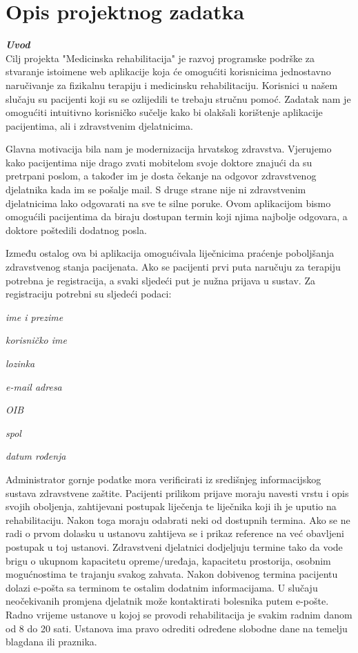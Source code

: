 \chapter{Opis projektnog zadatka}
		
		\textbf{\textit{Uvod}}\\
		
		Cilj projekta "Medicinska rehabilitacija" je razvoj programske podrške za stvaranje istoimene web aplikacije koja će omogućiti korisnicima jednostavno naručivanje za fizikalnu terapiju i medicinsku rehabilitaciju. Korisnici u našem slučaju su pacijenti koji su se ozlijedili te trebaju stručnu pomoć. Zadatak nam je omogućiti intuitivno korisničko sučelje kako bi olakšali korištenje aplikacije pacijentima, ali i zdravstvenim djelatnicima.
		
		Glavna motivacija bila nam je modernizacija hrvatskog zdravstva. Vjerujemo kako pacijentima nije drago zvati mobitelom svoje doktore znajući da su pretrpani poslom, a također im je dosta čekanje na odgovor zdravstvenog djelatnika kada im se pošalje mail. S druge strane nije ni zdravstvenim djelatnicima lako odgovarati na sve te silne poruke. Ovom aplikacijom bismo omogućili pacijentima da biraju dostupan termin koji njima najbolje odgovara, a doktore poštedili dodatnog posla.
		
		Između ostalog ova bi aplikacija omogućivala liječnicima praćenje poboljšanja zdravstvenog stanja pacijenata. Ako se pacijenti prvi puta naručuju za terapiju potrebna je registracija, a svaki sljedeći put je nužna prijava u sustav. Za registraciju potrebni su sljedeći podaci: 
		\begin{packed_item}
			\item \textit{ime i prezime}
			\item \textit{korisničko ime}
			\item \textit{lozinka}
			\item \textit{e-mail adresa}
			\item \textit{OIB}
			\item \textit{spol}
			\item \textit{datum rođenja}
		\end{packed_item}
		
		Administrator gornje podatke mora verificirati iz središnjeg informacijskog sustava zdravstvene zaštite. Pacijenti prilikom prijave moraju navesti vrstu i opis svojih oboljenja, zahtijevani postupak liječenja te liječnika koji ih je uputio na rehabilitaciju. Nakon toga moraju odabrati neki od dostupnih termina. Ako se ne radi o prvom dolasku u ustanovu zahtijeva se i prikaz reference na već obavljeni postupak u toj ustanovi. Zdravstveni djelatnici dodjeljuju termine tako da vode brigu o ukupnom kapacitetu opreme/uređaja, kapacitetu prostorija, osobnim mogućnostima te trajanju svakog zahvata. Nakon dobivenog termina pacijentu dolazi e-pošta sa terminom te ostalim dodatnim informacijama. U slučaju neočekivanih promjena djelatnik može kontaktirati bolesnika putem e-pošte. Radno vrijeme ustanove u kojoj se provodi rehabilitacija je svakim radnim danom od 8 do 20 sati. Ustanova ima pravo odrediti određene slobodne dane na temelju blagdana ili praznika.\\
		
